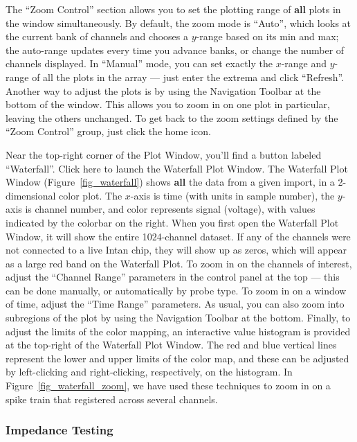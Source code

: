 The ``Zoom Control'' section allows you to set the plotting range of \textbf{all} plots in the window simultaneously. By default, the zoom mode is ``Auto'', which looks at the current bank of channels and chooses a $y$-range based on its min and max; the auto-range updates every time you advance banks, or change the number of channels displayed. In ``Manual'' mode, you can set exactly the $x$-range and $y$-range of all the plots in the array --- just enter the extrema and click ``Refresh''. Another way to adjust the plots is by using the Navigation Toolbar at the bottom of the window. This allows you to zoom in on one plot in particular, leaving the others unchanged. To get back to the zoom settings defined by the ``Zoom Control'' group, just click the home icon.

Near the top-right corner of the Plot Window, you'll find a button labeled ``Waterfall''. Click here to launch the Waterfall Plot Window. The Waterfall Plot Window (Figure~\ref{fig_waterfall}) shows \textbf{all} the data from a given import, in a 2-dimensional color plot. The $x$-axis is time (with units in sample number), the $y$-axis is channel number, and color represents signal (voltage), with values indicated by the colorbar on the right. When you first open the Waterfall Plot Window, it will show the entire 1024-channel dataset. If any of the channels were not connected to a live Intan chip, they will show up as zeros, which will appear as a large red band on the Waterfall Plot. To zoom in on the channels of interest, adjust the ``Channel Range'' parameters in the control panel at the top --- this can be done manually, or automatically by probe type. To zoom in on a window of time, adjust the ``Time Range'' parameters. As usual, you can also zoom into subregions of the plot by using the Navigation Toolbar at the bottom. Finally, to adjust the limits of the color mapping, an interactive value histogram is provided at the top-right of the Waterfall Plot Window. The red and blue vertical lines represent the lower and upper limits of the color map, and these can be adjusted by left-clicking and right-clicking, respectively, on the histogram. In Figure~\ref{fig_waterfall_zoom}, we have used these techniques to zoom in on a spike train that registered across several channels.


\subsubsection{Impedance Testing}
\label{sec_usage_buttonpanel_impedance}

